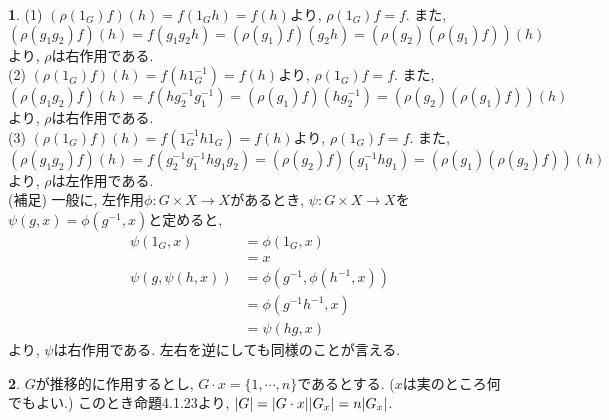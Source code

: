 \documentclass{amsart}
\theoremstyle{definition}
\newtheorem{ans}{}
\numberwithin{ans}{subsection}
\DeclarePairedDelimiter{\abs}{\lvert}{\rvert}
\begin{document}
\begin{ans}
  (1) $(\rho(1_G)f)(h) = f(1_Gh) = f(h)$より, $\rho(1_G)f = f$.
  また, $(\rho(g_1g_2)f)(h) = f(g_1g_2h) = (\rho(g_1)f)(g_2h) = (\rho(g_2)(\rho(g_1)f))(h)$
  より, $\rho$は右作用である.\\
  (2) $(\rho(1_G)f)(h) = f(h1_G^{-1}) = f(h)$より, $\rho(1_G)f = f$.
  また, $(\rho(g_1g_2)f)(h) = f(hg_2^{-1}g_1^{-1}) = (\rho(g_1)f)(hg_2^{-1}) = (\rho(g_2)(\rho(g_1)f))(h)$
  より, $\rho$は右作用である.\\
  (3) $(\rho(1_G)f)(h) = f(1_G^{-1}h1_G) = f(h)$より, $\rho(1_G)f = f$.
  また, $(\rho(g_1g_2)f)(h) = f(g_2^{-1}g_1^{-1}hg_1g_2) = (\rho(g_2)f)(g_1^{-1}hg_1) = (\rho(g_1)(\rho(g_2)f))(h)$
  より, $\rho$は左作用である.\\
  (補足) 一般に, 左作用$\phi: G \times X \rightarrow X$があるとき,
  $\psi: G \times X \rightarrow X$を$\psi(g, x) = \phi(g^{-1}, x)$と定めると,
  \begin{align*}
    \psi(1_G, x) &= \phi(1_G, x) \\
    &= x \\
    \psi(g, \psi(h, x)) &= \phi(g^{-1}, \phi(h^{-1}, x)) \\
    &= \phi(g^{-1}h^{-1}, x) \\
    &= \psi(hg, x)
  \end{align*}
  より, $\psi$は右作用である. 左右を逆にしても同様のことが言える.
\end{ans}

\begin{ans}
  $G$が推移的に作用するとし, $G \cdot x = \{1, \cdots , n\}$であるとする. ($x$は実のところ何でもよい.)
  このとき命題4.1.23より, $\abs{G} = \abs{G \cdot x}\abs{G_x} = n\abs{G_x}$.
\end{ans}
\end{document}
